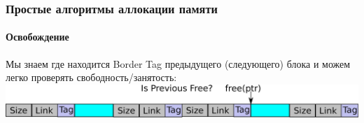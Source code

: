 \begin{frame}
\frametitle{Простые алгоритмы аллокации памяти}
\framesubtitle{Освобождение}

Мы знаем где находится Border Tag предыдущего (следующего) блока и можем легко
проверять свободность/занятость:
\includegraphics[width=.9\linewidth]{alloc-tag1}


\end{frame}
